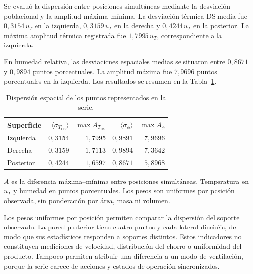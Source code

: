 Se evaluó la dispersión entre posiciones simultáneas mediante la desviación poblacional y la amplitud máxima--mínima. La desviación térmica DS media fue $0{,}3154\,u_T$ en la izquierda, $0{,}3159\,u_T$ en la derecha y $0{,}4244\,u_T$ en la posterior. La máxima amplitud térmica registrada fue $1{,}7995\,u_T$, correspondiente a la izquierda.

En humedad relativa, las desviaciones espaciales medias se situaron entre $0{,}8671$ y $0{,}9894$ puntos porcentuales. La amplitud máxima fue $7{,}9696$ puntos porcentuales en la izquierda. Los resultados se resumen en la Tabla~\ref{tab:res_uniformidad}.

\begin{table}[htbp]
\centering
\caption{Dispersión espacial de los puntos representados en la serie.}
\label{tab:res_uniformidad}
\small
\setlength{\tabcolsep}{5pt}
\begin{tabular}{lrrrr}
\toprule
Superficie & $\langle\sigma_{T_{\mathrm{DS}}}\rangle$ & $\max A_{T_{\mathrm{DS}}}$ & $\langle\sigma_{\phi}\rangle$ & $\max A_\phi$ \\
\midrule
Izquierda & $0{,}3154$ & $1{,}7995$ & $0{,}9891$ & $7{,}9696$ \\
Derecha & $0{,}3159$ & $1{,}7113$ & $0{,}9894$ & $7{,}3642$ \\
Posterior & $0{,}4244$ & $1{,}6597$ & $0{,}8671$ & $5{,}8968$ \\
\bottomrule
\end{tabular}
\par\vspace{3pt}
\begin{minipage}{0.98\textwidth}\footnotesize
$A$ es la diferencia máxima--mínima entre posiciones simultáneas. Temperatura en $u_T$ y humedad en puntos porcentuales. Los pesos son uniformes por posición observada, sin ponderación por área, masa ni volumen.
\end{minipage}
\end{table}


Los pesos uniformes por posición permiten comparar la dispersión del soporte observado. La pared posterior tiene cuatro puntos y cada lateral dieciséis, de modo que sus estadísticos responden a soportes distintos. Estos indicadores no constituyen mediciones de velocidad, distribución del chorro o uniformidad del producto. Tampoco permiten atribuir una diferencia a un modo de ventilación, porque la serie carece de acciones y estados de operación sincronizados.

